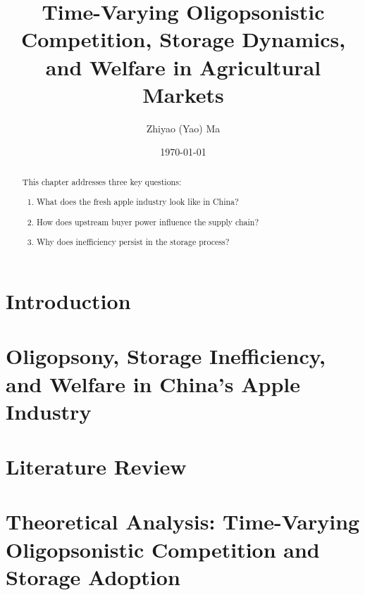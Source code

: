 \documentclass[12pt,authoryear, notitlepage]{elegantpaper}
\title{Time-Varying Oligopsonistic Competition, Storage Dynamics, and Welfare in Agricultural Markets}
\author{Zhiyao (Yao) Ma}
\institute{Committee: Richard J. Sexton, Jeffrey Williams, and Stephen Boucher}
\date{\today}
\begin{document}
\maketitle
\setcounter{tocdepth}{2}

\tableofcontents

\newpage
\chapter{Introduction}



\newpage
\chapter{Oligopsony, Storage Inefficiency, and Welfare in China’s Apple Industry}
\label{Chapter: descriptive chapter}

\begin{abstract}
This chapter addresses three key questions:
\begin{enumerate}
    \item What does the fresh apple industry look like in China?
    \item How does upstream buyer power influence the supply chain?
    \item Why does inefficiency persist in the storage process?
\end{enumerate}
\end{abstract}

    



\newpage
\chapter{Literature Review}

    


\newpage
\chapter{Theoretical Analysis: Time-Varying Oligopsonistic Competition and Storage Adoption}
\end{document}
